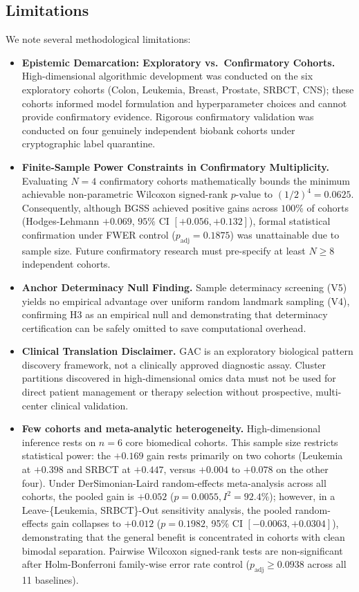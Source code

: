 \documentclass[pdflatex,sn-mathphys-num]{sn-jnl}
\theoremstyle{thmstyleone}
\theoremstyle{thmstyletwo}
\theoremstyle{thmstylethree}
\begin{document}
\subsection{Limitations}\label{sec:limitations}\label{sec:limits_modes}
We note several methodological limitations:
\begin{itemize}
\item \textbf{Epistemic Demarcation: Exploratory vs.\ Confirmatory Cohorts.} High-dimensional algorithmic development was conducted on the six exploratory cohorts (Colon, Leukemia, Breast, Prostate, SRBCT, CNS); these cohorts informed model formulation and hyperparameter choices and cannot provide confirmatory evidence. Rigorous confirmatory validation was conducted on four genuinely independent biobank cohorts under cryptographic label quarantine.
\item \textbf{Finite-Sample Power Constraints in Confirmatory Multiplicity.} Evaluating $N=4$ confirmatory cohorts mathematically bounds the minimum achievable non-parametric Wilcoxon signed-rank $p$-value to $(1/2)^4 = 0.0625$. Consequently, although BGSS achieved positive gains across $100\%$ of cohorts (Hodges-Lehmann $+0.069$, $95\%$ CI $[+0.056, +0.132]$), formal statistical confirmation under FWER control ($p_{\text{adj}} = 0.1875$) was unattainable due to sample size. Future confirmatory research must pre-specify at least $N \ge 8$ independent cohorts.
\item \textbf{Anchor Determinacy Null Finding.} Sample determinacy screening (V5) yields no empirical advantage over uniform random landmark sampling (V4), confirming H3 as an empirical null and demonstrating that determinacy certification can be safely omitted to save computational overhead.
\item \textbf{Clinical Translation Disclaimer.} GAC is an exploratory biological pattern discovery framework, not a clinically approved diagnostic assay. Cluster partitions discovered in high-dimensional omics data must not be used for direct patient management or therapy selection without prospective, multi-center clinical validation.
    \item \textbf{Few cohorts and meta-analytic heterogeneity.} High-dimensional inference rests on $n = 6$ core biomedical cohorts. This sample size restricts statistical power: the $+0.169$ gain rests primarily on two cohorts (Leukemia at $+0.398$ and SRBCT at $+0.447$, versus $+0.004$ to $+0.078$ on the other four). Under DerSimonian-Laird random-effects meta-analysis across all cohorts, the pooled gain is $+0.052$ ($p = 0.0055, I^2 = 92.4\%$); however, in a Leave-\{Leukemia, SRBCT\}-Out sensitivity analysis, the pooled random-effects gain collapses to $+0.012$ ($p = 0.1982$, 95\% CI $[-0.0063, +0.0304]$), demonstrating that the general benefit is concentrated in cohorts with clean bimodal separation. Pairwise Wilcoxon signed-rank tests are non-significant after Holm-Bonferroni family-wise error rate control ($p_{\text{adj}} \ge 0.0938$ across all 11 baselines).

\end{itemize}
\end{document}
